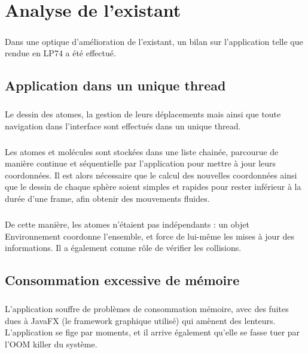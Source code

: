 \chapter{Analyse de l'existant}
\label{mise_en_oeuvre}

\paragraph{}
Dans une optique d'amélioration de l'existant, un bilan sur l'application telle
que rendue en LP74 a été effectué.


\section{Application dans un unique thread}

\paragraph{}
Le dessin des atomes, la gestion de leurs déplacements mais ainsi que toute
navigation dans l'interface sont effectués dans un unique thread.

\paragraph{}
Les atomes et molécules sont stockées dans une liste chainée, parcourue de
manière continue et séquentielle par l'application pour mettre à jour leurs
coordonnées. Il est alors nécessaire que le calcul des nouvelles coordonnées
ainsi que le dessin de chaque sphère soient simples et rapides pour rester
inférieur à la durée d'une frame, afin obtenir des mouvements fluides.

\paragraph{}
De cette manière, les atomes n'étaient pas indépendants : un objet
Environnement coordonne l'ensemble, et force de lui-même les mises à jour des
informations.  Il a également comme rôle de vérifier les collisions.


\section{Consommation excessive de mémoire}

\paragraph{}
L'application souffre de problèmes de consommation mémoire, avec des fuites
dues à JavaFX (le framework graphique utilisé) qui amènent des lenteurs.
L'application se fige par moments, et il arrive également qu'elle se fasse
tuer par l'OOM killer du système.


